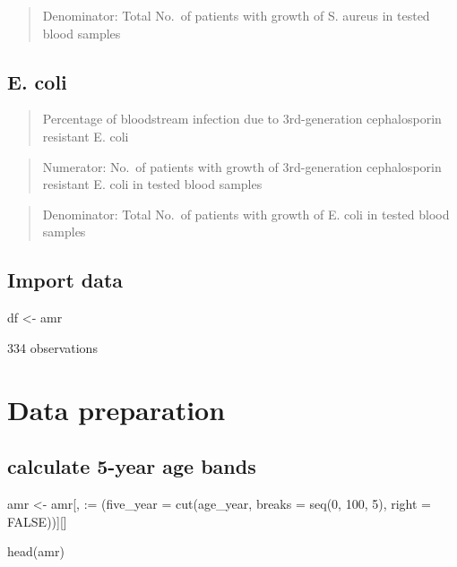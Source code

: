 \documentclass[
  letterpaper,
  DIV=11,
  numbers=noendperiod]{scrreprt}
\newenvironment{Shaded}{\begin{snugshade}}{\end{snugshade}}
\newcommand{\AttributeTok}[1]{\textcolor[rgb]{0.40,0.45,0.13}{#1}}
\newcommand{\ConstantTok}[1]{\textcolor[rgb]{0.56,0.35,0.01}{#1}}
\newcommand{\DecValTok}[1]{\textcolor[rgb]{0.68,0.00,0.00}{#1}}
\newcommand{\FunctionTok}[1]{\textcolor[rgb]{0.28,0.35,0.67}{#1}}
\newcommand{\NormalTok}[1]{\textcolor[rgb]{0.00,0.23,0.31}{#1}}
\newcommand{\OtherTok}[1]{\textcolor[rgb]{0.00,0.23,0.31}{#1}}
\newcommand{\StringTok}[1]{\textcolor[rgb]{0.13,0.47,0.30}{#1}}
\begin{document}
\begin{quote}
Denominator: Total No.~of patients with growth of S. aureus in tested
blood samples
\end{quote}

\subsection{E. coli}\label{e.-coli}

\begin{quote}
Percentage of bloodstream infection due to 3rd-generation cephalosporin
resistant E. coli
\end{quote}

\begin{quote}
Numerator: No.~of patients with growth of 3rd-generation cephalosporin
resistant E. coli in tested blood samples
\end{quote}

\begin{quote}
Denominator: Total No.~of patients with growth of E. coli in tested
blood samples
\end{quote}

\subsection{Import data}\label{import-data}

\begin{Shaded}
\begin{Highlighting}[]
\NormalTok{df }\OtherTok{\textless{}{-}}\NormalTok{ amr}
\end{Highlighting}
\end{Shaded}

334 observations

\section{Data preparation}\label{data-preparation}

\subsection{calculate 5-year age
bands}\label{calculate-5-year-age-bands}

\begin{Shaded}
\begin{Highlighting}[]
\NormalTok{amr }\OtherTok{\textless{}{-}}\NormalTok{ amr[, }\StringTok{\textasciigrave{}}\AttributeTok{:=}\StringTok{\textasciigrave{}}\NormalTok{ (}\AttributeTok{five\_year =} \FunctionTok{cut}\NormalTok{(age\_year, }\AttributeTok{breaks =} \FunctionTok{seq}\NormalTok{(}\DecValTok{0}\NormalTok{, }\DecValTok{100}\NormalTok{, }\DecValTok{5}\NormalTok{), }\AttributeTok{right =} \ConstantTok{FALSE}\NormalTok{))][]}

\FunctionTok{head}\NormalTok{(amr)}
\end{Highlighting}
\end{Shaded}
\end{document}
